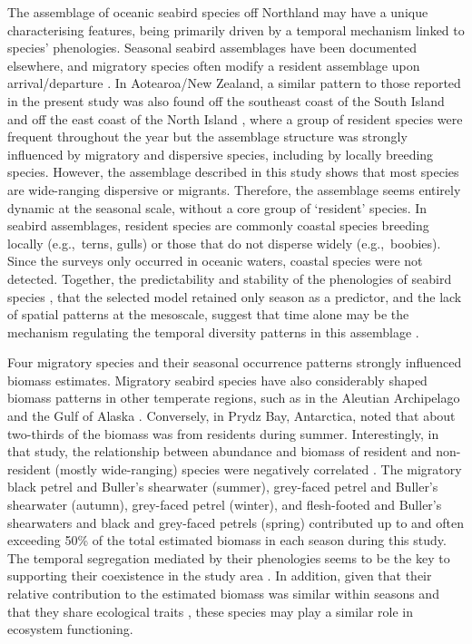 \documentclass[preprint, 3p, authoryear]{elsarticle} %
\begin{document}
The assemblage of oceanic seabird species off Northland may have a unique characterising features, being primarily driven by a temporal mechanism linked to species' phenologies. Seasonal seabird assemblages have been documented elsewhere, and migratory species often modify a resident assemblage upon arrival/departure \citep{renner2008, hunt2014, simon2024}. In Aotearoa/New Zealand, a similar pattern to those reported in the present study was also found off the southeast coast of the South Island \citep{daudt2025} and off the east coast of the North Island \citep{vooren1972}, where a group of resident species were frequent throughout the year but the assemblage structure was strongly influenced by migratory and dispersive species, including by locally breeding species. However, the assemblage described in this study shows that most species are wide-ranging dispersive or migrants. Therefore, the assemblage seems entirely dynamic at the seasonal scale, without a core group of `resident' species. In seabird assemblages, resident species are commonly coastal species breeding locally (e.g.,~terns, gulls) or those that do not disperse widely (e.g.,~boobies). Since the surveys only occurred in oceanic waters, coastal species were not detected. Together, the predictability and stability of the phenologies of seabird species \citep{keogan2018}, that the selected model retained only season as a predictor, and the lack of spatial patterns at the mesoscale, suggest that time alone may be the mechanism regulating the temporal diversity patterns in this assemblage \citep[see][]{tonkin2017}.

Four migratory species and their seasonal occurrence patterns strongly influenced biomass estimates. Migratory seabird species have also considerably shaped biomass patterns in other temperate regions, such as in the Aleutian Archipelago \citep{renner2008} and the Gulf of Alaska \citep{hunt2005}. Conversely, in Prydz Bay, Antarctica, \citet{woehler1997} noted that about two-thirds of the biomass was from residents during summer. Interestingly, in that study, the relationship between abundance and biomass of resident and non-resident (mostly wide-ranging) species were negatively correlated \citep{woehler1997}. The migratory black petrel and Buller's shearwater (summer), grey-faced petrel and Buller's shearwater (autumn), grey-faced petrel (winter), and flesh-footed and Buller's shearwaters and black and grey-faced petrels (spring) contributed up to and often exceeding 50\% of the total estimated biomass in each season during this study. The temporal segregation mediated by their phenologies seems to be the key to supporting their coexistence in the study area \citep{rudolf2019}. In addition, given that their relative contribution to the estimated biomass was similar within seasons and that they share ecological traits \citep{tavares2019}, these species may play a similar role in ecosystem functioning.
\end{document}
